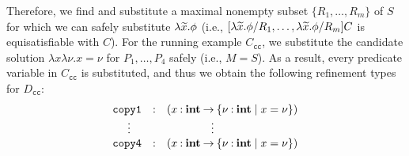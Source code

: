 Therefore, we find and substitute a maximal nonempty subset
\(\{R_1,\dots,R_m\}\) of \(S\) for which we can safely substitute
\(\lambda\widetilde{x}.\phi\) (i.e.,
\([\lambda\widetilde{x}.\phi/R_1,\dots,\lambda\widetilde{x}.\phi/R_m]C\) is
equisatisfiable with \(C\)).
%
%
For the running example \(C_{\texttt{cc}}\), we substitute the candidate
solution \(\lambda x \lambda \nu.x=\nu\) for \(P_1,\dots,P_4\) safely
(i.e., \(M=S\)).  As a result, every predicate variable in
\(C_{\texttt{cc}}\) is substituted, and thus we obtain the following
refinement types for \(D_{\texttt{cc}}\):
\[
\begin{array}{rcl}
\texttt{copy1}&\mathbin{:}&(x\mathbin{:}{\mathbf{int}}\mathbin{\rightarrow}{\{{\nu\mathbin{:}\mathbf{int} \mid x=\nu}\}}) \\
\vdots\quad &&\qquad\qquad \vdots \\
\texttt{copy4}&\mathbin{:}&(x\mathbin{:}{\mathbf{int}}\mathbin{\rightarrow}{\{{\nu\mathbin{:}\mathbf{int} \mid x=\nu}\}})
\end{array}
\]



%
